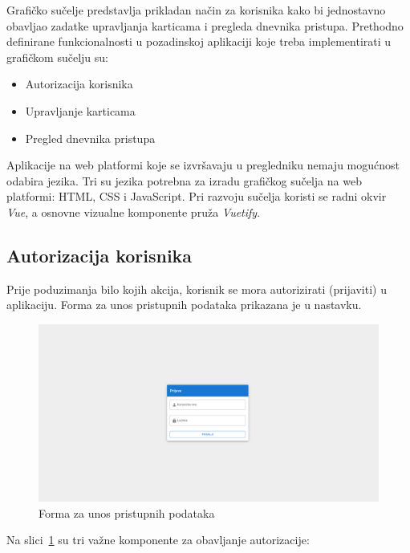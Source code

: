 Grafičko sučelje predstavlja prikladan način za korisnika kako bi jednostavno obavljao zadatke upravljanja karticama
i pregleda dnevnika pristupa.
Prethodno definirane funkcionalnosti u pozadinskoj aplikaciji koje treba implementirati u grafičkom sučelju su:

\begin{itemize}
    \item Autorizacija korisnika
    \item Upravljanje karticama
    \item Pregled dnevnika pristupa
\end{itemize}

Aplikacije na web platformi koje se izvršavaju u pregledniku nemaju mogućnost odabira jezika.
Tri su jezika potrebna za izradu grafičkog sučelja na web platformi: HTML, CSS i JavaScript.
Pri razvoju sučelja koristi se radni okvir \textit{Vue}, a osnovne vizualne komponente pruža \textit{Vuetify}.

\subsection{Autorizacija korisnika}

Prije poduzimanja bilo kojih akcija, korisnik se mora autorizirati (prijaviti) u aplikaciju.
Forma za unos pristupnih podataka prikazana je u nastavku.

\begin{figure}[h!]
    \centering
    \includegraphics[width=\textwidth]{images/login-view}
    \caption{Forma za unos pristupnih podataka}
    \label{fig:login-view}
\end{figure}

\pagebreak

Na slici~\ref{fig:login-view} su tri važne komponente za obavljanje autorizacije:

